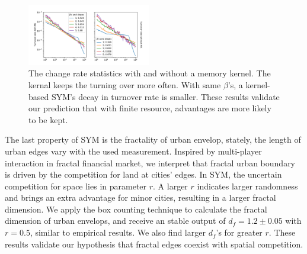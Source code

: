 \documentclass[reprint,unsortedaddress,amsmath,amssymb,aps,prl,showkeys]{revtex4-2}
\begin{document}
\begin{figure}
    \centering
    \includegraphics[width = 0.48\textwidth]{pics/in_one_now_1580064563.85876.pdf}
    \caption{The change rate statistics with and without a memory kernel. The kernal keeps the turning over more often. With same $\beta$'s, a kernel-based SYM's decay in turnover rate is smaller. These results validate our prediction that with finite resource, advantages are more likely to be kept.}
    \label{changerate}
\end{figure}

The last property of SYM is the fractality of urban envelop, stately, the length of urban edges vary with the used measurement. Inspired by multi-player interaction in fractal financial market\cite{PhysRevE.65.037106}, we interpret that fractal urban boundary is driven by the competition for land at cities' edges. In SYM, the uncertain competition for space lies in parameter $r$. A larger $r$ indicates larger randomness and brings an extra advantage for minor cities, resulting in a larger fractal dimension. We apply the box counting technique to calculate the fractal dimension of urban envelops, and receive an stable output of $d_f = 1.2\pm 0.05$ with $r = 0.5$, similar to empirical results\cite{batty1992form}. We also find larger $d_f$'s for greater $r$. These results validate our hypothesis that fractal edges coexist with spatial competition. 

\end{document}
